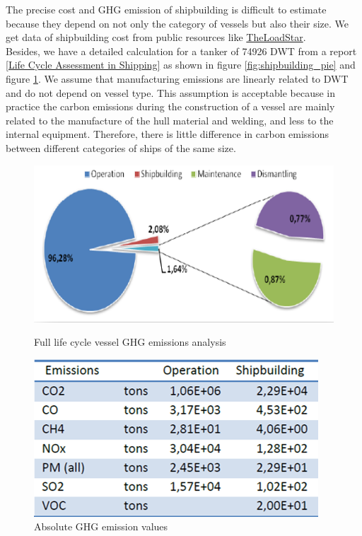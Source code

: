 \documentclass[a4paper,12pt]{article}
\begin{document}
The precise cost and GHG emission of shipbuilding is difficult to estimate because they depend on not only the category of vessels but also their size.  We get data of shipbuilding cost from public resources like \href{https://theloadstar.com/fleet-building-hmm-set-to-order-nine-methanol-powered-8000-teu-ships/}{TheLoadStar}.\\

Besides, we have a detailed calculation for a tanker of  74926 DWT from a report \href{https://www.researchgate.net/publication/280313533_Applications_of_Life_Cycle_Assessment_in_Shipping}{[Life Cycle Assessment in Shipping]} as shown in figure \ref{fig:shipbuilding_pie} and figure \ref{fig:shipbuilding_table}.
We assume that manufacturing emissions are linearly related to DWT and do not depend on vessel type.
This assumption is acceptable because in practice the carbon emissions during the construction of a vessel are mainly related to the manufacture of the hull material and welding, and less to the internal equipment.
Therefore, there is little difference in carbon emissions between different categories of ships of the same size.

\begin{figure}[htbp]
	\centering
	\begin{minipage}[t]{0.49\textwidth}
		\centering
		\includegraphics[width= \linewidth]{report-fig/shipbuilding_pie.png}
		\caption{Full life cycle vessel GHG emissions analysis}
		\label{fig:shipbuilding_pie}
	\end{minipage}
	\begin{minipage}[t]{0.49\textwidth}
		\centering
		\includegraphics[width=\linewidth]{report-fig/shipbuilding table.png}
		\caption{Absolute GHG emission values}
		\label{fig:shipbuilding_table}
	\end{minipage}
\end{figure}
\end{document}
